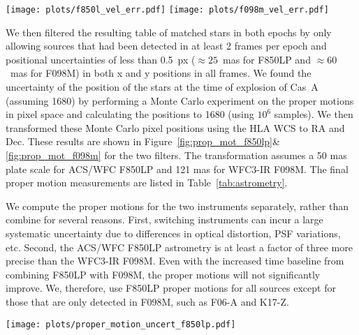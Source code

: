 \documentclass{aa}
\begin{document}
\begin{figure*}[h!]

  \texttt{[image: plots/f850l\_vel\_err.pdf]}
  \texttt{[image: plots/f098m\_vel\_err.pdf]}
    \caption{Proper motion uncertainty for ACS/WFC F850LP (Left) and WFC3-IR F089M (Right) in the x (blue) and y directions (orange). The candidates' companions are indicated with star symbols. The F850LP proper motion uncertainties are up to an order of magnitude better than that of F098M. The increase in uncertainty at bright magnitudes is likely due to saturation of bright sources.}
       \label{fig:vel_err}
\end{figure*}

We then filtered the resulting table of matched stars in both epochs by only allowing sources that had been detected in at least 2 frames per epoch and positional uncertainties of less than 0.5~px ($\approx 25$~mas for F850LP and $\approx 60$~mas for F098M) in both x and y positions in all frames. We found the uncertainty of the position of the stars at the time of explosion of Cas~A (assuming 1680) by performing a Monte Carlo experiment on the proper motions in pixel space and calculating the positions to 1680 (using $10^6$ samples). We then transformed these Monte Carlo pixel positions using the HLA WCS to RA and Dec. These results are shown in Figure~\ref{fig:prop_mot_f850lp}\&\ref{fig:prop_mot_f098m} for the two filters. The transformation assumes a 50 mas plate scale for ACS/WFC F850LP and 121 mas for WFC3-IR F098M. The final proper motion measurements are listed in Table~\ref{tab:astrometry}.

We compute the proper motions for the two instruments separately, rather than combine for several reasons. First, switching instruments can incur a large systematic uncertainty due to differences in optical distortion, PSF variations, etc. Second, the ACS/WFC F850LP astrometry is at least a factor of three more precise than the WFC3-IR F098M. Even with the increased time baseline from combining F850LP with F098M, the proper motions will not significantly improve. We, therefore, use F850LP proper motions for all sources except for those that are only detected in F098M, such as F06-A and K17-Z.



\begin{figure*}[h!]
 \centering
 \texttt{[image: plots/proper\_motion\_uncert\_f850lp.pdf]}
    \caption{HST F850LP (epoch 2003-11-13) image showing the probabilities for the positions of the candidates in 1680. The center of expansion (including the uncertainty of $1\arcsec$) is depicted as a black circle. The search radius of 600~\kms around the center of expansion is shown in orange. The contours show 68\%, 95\%, 99.7\%, and 99.9937\% confidence intervals (using the same colors as in Figure~\ref{fig:pure_seds}). A red arrow marks the movement since 1680 to their current position. Some candidates are not detected in this filter and thus proper motion is not shown for them.}
       \label{fig:prop_mot_f850lp}
\end{figure*}
\end{document}
